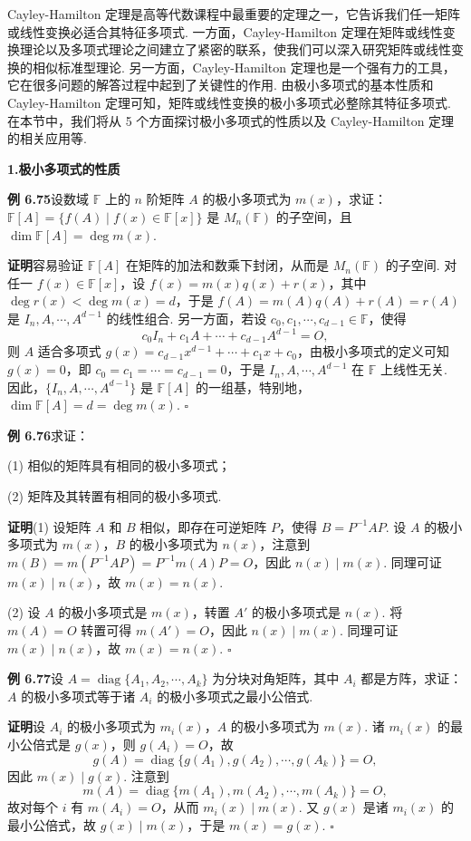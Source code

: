 \documentclass[UTF8, 12pt, fontset=fandol, oneside]{ctexart}
\begin{document}
Cayley-Hamilton 定理是高等代数课程中最重要的定理之一，它告诉我们任一矩阵或线性变换必适合其特征多项式. 一方面，Cayley-Hamilton 定理在矩阵或线性变换理论以及多项式理论之间建立了紧密的联系，使我们可以深入研究矩阵或线性变换的相似标准型理论. 另一方面，Cayley-Hamilton 定理也是一个强有力的工具，它在很多问题的解答过程中起到了关键性的作用. 由极小多项式的基本性质和 Cayley-Hamilton 定理可知，矩阵或线性变换的极小多项式必整除其特征多项式. 在本节中，我们将从 5 个方面探讨极小多项式的性质以及 Cayley-Hamilton 定理的相关应用等.

\noindent\textbf{1.\quad 极小多项式的性质}

\noindent\textbf{例 6.75}\quad 设数域 $\mathbb{F}$ 上的 $n$ 阶矩阵 $A$ 的极小多项式为 $m(x)$，求证：$\mathbb{F}[A]=\{f(A)\mid f(x)\in\mathbb{F}[x]\}$ 是 $M_n(\mathbb{F})$ 的子空间，且 $\dim\mathbb{F}[A]=\deg m(x)$.

\noindent\textbf{证明}\quad 容易验证 $\mathbb{F}[A]$ 在矩阵的加法和数乘下封闭，从而是 $M_n(\mathbb{F})$ 的子空间. 对任一 $f(x)\in\mathbb{F}[x]$，设 $f(x)=m(x)q(x)+r(x)$，其中 $\deg r(x)<\deg m(x)=d$，于是 $f(A)=m(A)q(A)+r(A)=r(A)$ 是 $I_n,A,\cdots,A^{d-1}$ 的线性组合. 另一方面，若设 $c_0,c_1,\cdots,c_{d-1}\in\mathbb{F}$，使得
\[
c_0I_n+c_1A+\cdots+c_{d-1}A^{d-1}=O,
\]
则 $A$ 适合多项式 $g(x)=c_{d-1}x^{d-1}+\cdots+c_1x+c_0$，由极小多项式的定义可知 $g(x)=0$，即 $c_0=c_1=\cdots=c_{d-1}=0$，于是 $I_n,A,\cdots,A^{d-1}$ 在 $\mathbb{F}$ 上线性无关. 因此，$\{I_n,A,\cdots,A^{d-1}\}$ 是 $\mathbb{F}[A]$ 的一组基，特别地，$\dim\mathbb{F}[A]=d=\deg m(x)$. $\square$

\noindent\textbf{例 6.76}\quad 求证：

(1) 相似的矩阵具有相同的极小多项式；

(2) 矩阵及其转置有相同的极小多项式.

\noindent\textbf{证明}\quad (1) 设矩阵 $A$ 和 $B$ 相似，即存在可逆矩阵 $P$，使得 $B=P^{-1}AP$. 设 $A$ 的极小多项式为 $m(x)$，$B$ 的极小多项式为 $n(x)$，注意到 $m(B)=m(P^{-1}AP)=P^{-1}m(A)P=O$，因此 $n(x)\mid m(x)$. 同理可证 $m(x)\mid n(x)$，故 $m(x)=n(x)$.

(2) 设 $A$ 的极小多项式是 $m(x)$，转置 $A'$ 的极小多项式是 $n(x)$. 将 $m(A)=O$ 转置可得 $m(A')=O$，因此 $n(x)\mid m(x)$. 同理可证 $m(x)\mid n(x)$，故 $m(x)=n(x)$. $\square$

\noindent\textbf{例 6.77}\quad 设 $A=\operatorname{diag}\{A_1,A_2,\cdots,A_k\}$ 为分块对角矩阵，其中 $A_i$ 都是方阵，求证：$A$ 的极小多项式等于诸 $A_i$ 的极小多项式之最小公倍式.

\noindent\textbf{证明}\quad 设 $A_i$ 的极小多项式为 $m_i(x)$，$A$ 的极小多项式为 $m(x)$. 诸 $m_i(x)$ 的最小公倍式是 $g(x)$，则 $g(A_i)=O$，故
\[
g(A)=\operatorname{diag}\{g(A_1),g(A_2),\cdots,g(A_k)\}=O,
\]
因此 $m(x)\mid g(x)$. 注意到
\[
m(A)=\operatorname{diag}\{m(A_1),m(A_2),\cdots,m(A_k)\}=O,
\]
故对每个 $i$ 有 $m(A_i)=O$，从而 $m_i(x)\mid m(x)$. 又 $g(x)$ 是诸 $m_i(x)$ 的最小公倍式，故 $g(x)\mid m(x)$，于是 $m(x)=g(x)$. $\square$
\end{document}
